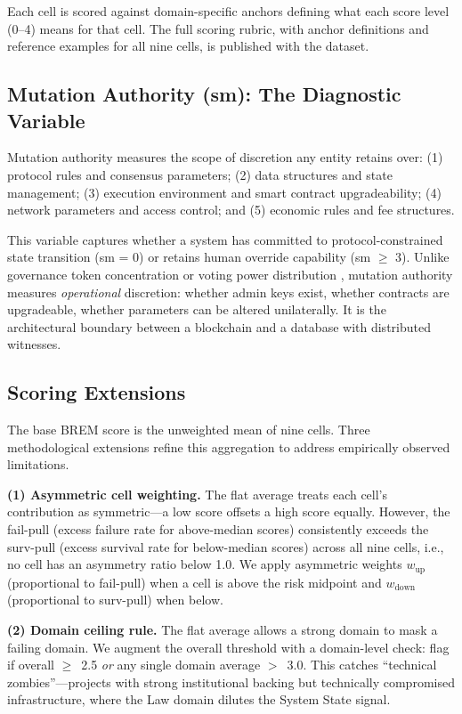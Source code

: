 \documentclass[conference]{IEEEtran}
\begin{document}
Each cell is scored against domain-specific anchors defining what each score level (0--4) means for that cell. The full scoring rubric, with anchor definitions and reference examples for all nine cells, is published with the dataset.

\subsection{Mutation Authority (sm): The Diagnostic Variable}

Mutation authority measures the scope of discretion any entity retains over: (1) protocol rules and consensus parameters; (2) data structures and state management; (3) execution environment and smart contract upgradeability; (4) network parameters and access control; and (5) economic rules and fee structures.

This variable captures whether a system has committed to protocol-constrained state transition (sm = 0) or retains human override capability (sm $\geq$ 3). Unlike governance token concentration \cite{barbereau2022} or voting power distribution \cite{fritsch2024}, mutation authority measures \textit{operational} discretion: whether admin keys exist, whether contracts are upgradeable, whether parameters can be altered unilaterally. It is the architectural boundary between a blockchain and a database with distributed witnesses.

\subsection{Scoring Extensions}\label{sec:extensions}

The base BREM score is the unweighted mean of nine cells. Three methodological extensions refine this aggregation to address empirically observed limitations.

\textbf{(1) Asymmetric cell weighting.} The flat average treats each cell's contribution as symmetric---a low score offsets a high score equally. However, the fail-pull (excess failure rate for above-median scores) consistently exceeds the surv-pull (excess survival rate for below-median scores) across all nine cells, i.e., no cell has an asymmetry ratio below 1.0. We apply asymmetric weights $w_\text{up}$ (proportional to fail-pull) when a cell is above the risk midpoint and $w_\text{down}$ (proportional to surv-pull) when below.

\textbf{(2) Domain ceiling rule.} The flat average allows a strong domain to mask a failing domain. We augment the overall threshold with a domain-level check: flag if overall $\geq$~2.5 \textit{or} any single domain average $>$~3.0. This catches ``technical zombies''---projects with strong institutional backing but technically compromised infrastructure, where the Law domain dilutes the System State signal.
\end{document}
